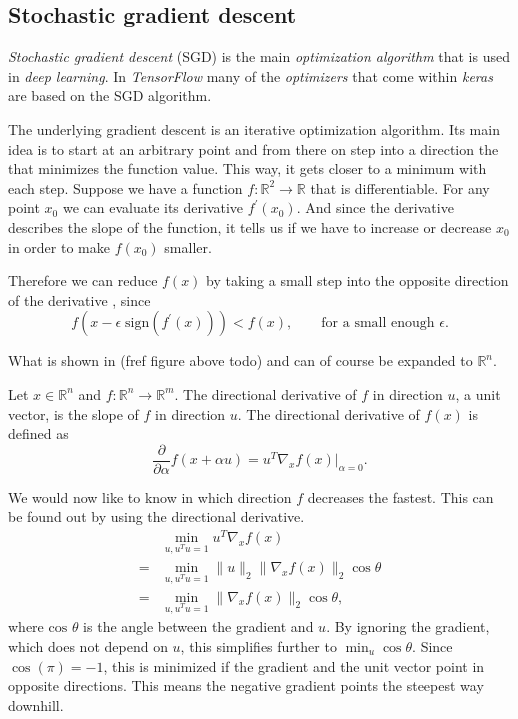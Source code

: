 \subsection{Stochastic gradient descent}
\label{sec:stochastic-gradient-descent}
\emph{Stochastic gradient descent} (SGD) is the main \emph{optimization algorithm} that is used in \emph{deep learning}.
In \emph{TensorFlow} many of the \emph{optimizers} that come within \emph{keras} are based on the SGD algorithm.

The underlying gradient descent is an iterative optimization algorithm.
Its main idea is to start at an arbitrary point and from there on step into a direction the that minimizes the function value.
This way, it gets closer to a minimum with each step.
Suppose we have a function \(f : \mathbb{R}^2 \rightarrow \mathbb{R}\) that is differentiable.
For any point \(x_0\) we can evaluate its derivative \(f^{\prime}(x_0)\).
And since the derivative describes the slope of the function, it tells us if we have to increase or decrease \(x_0\) in order to make \(f(x_0)\) smaller.

Therefore we can reduce \(f(x)\) by taking a small step into the opposite direction of the derivative \cite{cauchy}, since
\begin{equation}
    \label{eq:cauchy}
    f(x - \epsilon \; \text{sign}(f^{\prime}(x))) < f(x), \qquad \text{for a small enough } \epsilon.
\end{equation}


What is shown in (fref figure above todo) and  can of course be expanded to \(\mathbb{R}^n\).

Let \(x \in \mathbb{R}^n\) and \(f : \mathbb{R}^n \rightarrow \mathbb{R}^m\).
The directional derivative of \(f\) in direction \(u\), a unit vector, is the slope of \(f\) in direction \(u\).
The directional derivative of \(f(x)\) is defined as 
\begin{equation}
    \frac{\partial}{\partial \alpha} f(x + \alpha u) = u^{T} \nabla_x f(x) \big\vert_{\alpha = 0}.
\end{equation}

We would now like to know in which direction \(f\) decreases the fastest.
This can be found out by using the directional derivative.
\begin{align}
      &\min_{u, u^{T}u = 1} u^{T} \nabla_x f(x) \\
    = &\min_{u, u^{T}u = 1} \lVert u \rVert_2 \lVert \nabla_x f(x) \rVert_2 \cos \theta \\
    = &\min_{u, u^{T}u = 1} \lVert \nabla_x f(x) \rVert_2 \cos \theta,
\end{align}
where \(\text{cos } \theta\) is the angle between the gradient and \(u\).
By ignoring the gradient, which does not depend on \(u\), this simplifies further to \(\min_{u} \cos \theta\).
Since \(\cos(\pi) = -1\), this is minimized if the gradient and the unit vector point in opposite directions.
This means the negative gradient points the steepest way downhill.


